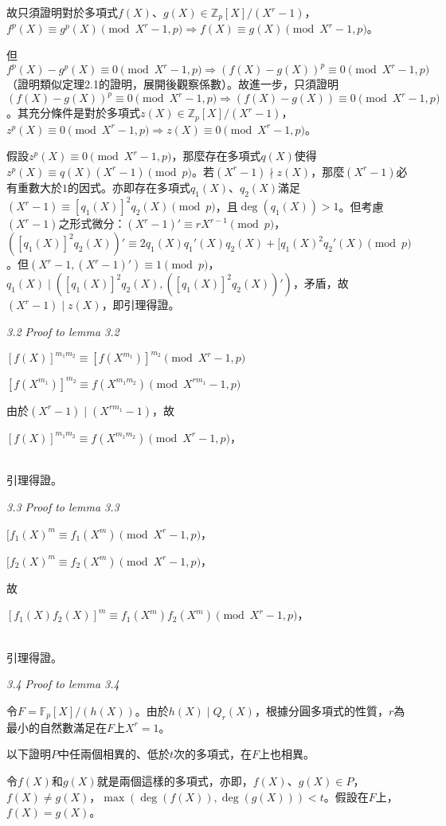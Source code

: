 \documentclass{article}
\begin{document}
    故只須證明對於多項式$f(X)$、$g(X)\in \mathbb{Z}_{p}[X]/(X^r-1)$，$f^p(X)\equiv g^p(X)\pmod{X^r-1,p}\Rightarrow f(X)\equiv g(X)\pmod{X^r-1,p}$。

    但$f^p(X)-g^p(X)\equiv 0\pmod{X^r-1,p}\Rightarrow (f(X)-g(X))^p\equiv 0\pmod{X^r-1,p}$（證明類似定理2.1的證明，展開後觀察係數）。故進一步，只須證明$(f(X)-g(X))^p\equiv 0\pmod{X^r-1,p}\Rightarrow(f(X)-g(X))\equiv 0\pmod{X^r-1,p}$。其充分條件是對於多項式$z(X)\in\mathbb{Z}_{p}[X]/(X^r-1)$，$z^p(X)\equiv 0\pmod{X^r-1,p}\Rightarrow z(X)\equiv 0\pmod{X^r-1,p}$。

    假設$z^p(X)\equiv 0\pmod{X^r-1,p}$，那麼存在多項式$q(X)$使得$z^p(X)\equiv q(X)(X^r-1)\pmod{p}$。若$(X^r-1)\nmid z(X)$，那麼$(X^r-1)$必有重數大於$1$的因式。亦即存在多項式$q_1(X)$、$q_2(X)$滿足$(X^r-1)\equiv [q_1(X)]^2q_2(X)\pmod{p}$，且$\deg(q_1(X))>1$。但考慮$(X^r-1)$之形式微分：$(X^r-1)'\equiv rX^{r-1}\pmod{p}$，$([q_1(X)]^2q_2(X))'\equiv 2q_1(X)q_1'(X)q_2(X)+[q_1(X)^2q_2'(X)\pmod{p}$。但$(X^r-1,(X^r-1)')\equiv 1\pmod{p}$，$q_1(X)\mid([q_1(X)]^2q_2(X), ([q_1(X)]^2q_2(X))')$，矛盾，故$(X^r-1)\mid z(X)$，即引理得證。

\noindent\textit{3.2 Proof to lemma 3.2}

    $[f(X)]^{m_1m_2}\equiv [f(X^{m_1})]^{m_2}\pmod{X^r-1,p}$

    $[f(X^{m_1})]^{m_2}\equiv f(X^{m_1m_2})\pmod{X^{rm_1}-1,p}$

    由於$(X^r-1)\mid(X^{rm_1}-1)$，故\\
    \centerline{$[f(X)]^{m_1m_2}\equiv f(X^{m_1m_2})\pmod{X^r-1,p}$，}\\
    引理得證。

\noindent\textit{3.3 Proof to lemma 3.3}

    $[f_1(X)^m\equiv f_1(X^m)\pmod{X^r-1,p}$，

    $[f_2(X)^m\equiv f_2(X^m)\pmod{X^r-1,p}$，
    
    故\\
    \centerline{$[f_1(X)f_2(X)]^m\equiv f_1(X^m)f_2(X^m)\pmod{X^r-1,p}$，}\\
    引理得證。

\noindent\textit{3.4 Proof to lemma 3.4}

    令$F=\mathbb{F}_p[X]/(h(X))$。由於$h(X)\mid Q_r(X)$，根據分圓多項式的性質，$r$為最小的自然數滿足在$F$上$X^r=1$。

    以下證明$P$中任兩個相異的、低於$t$次的多項式，在$F$上也相異。

    令$f(X)$和$g(X)$就是兩個這樣的多項式，亦即，$f(X)$、$g(X)\in P$，$f(X)\neq g(X)$，$\max(\deg(f(X)),\deg(g(X)))<t$。假設在$F$上，$f(X)=g(X)$。
\end{document}

